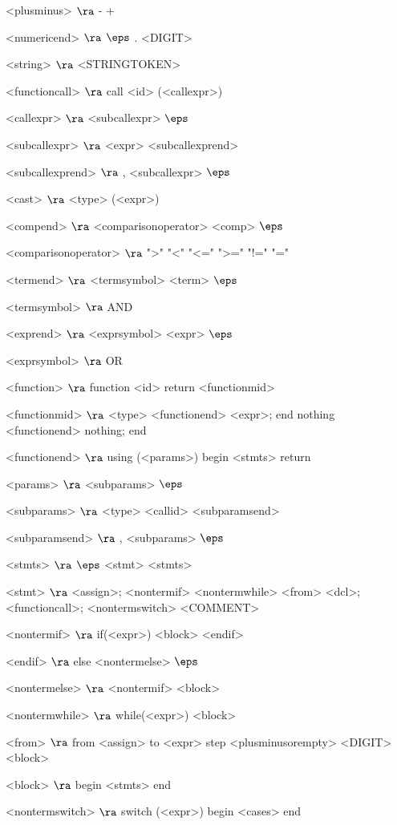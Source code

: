 \begin{grammar}
<plusminus> $\ra$ - 
\alt +

<numericend> $\ra$ $\eps$
\alt . <DIGIT>

<string> $\ra$ <STRINGTOKEN>

<functioncall> $\ra$ call <id> (<callexpr>)

<callexpr> $\ra$ <subcallexpr>
\alt$\eps$

<subcallexpr> $\ra$ <expr> <subcallexprend>

<subcallexprend> $\ra$ , <subcallexpr>
\alt$\eps$

<cast> $\ra$ <type> (<expr>)

<compend> $\ra$ <comparisonoperator> <comp>
\alt$\eps$

<comparisonoperator> $\ra$ ">"
				\alt "<"
				\alt "<="
				\alt ">="
				\alt "!="
				\alt "="

<termend> $\ra$ <termsymbol> <term>
\alt$\eps$

<termsymbol> $\ra$ AND 

<exprend> $\ra$ <exprsymbol> <expr>
\alt$\eps$

<exprsymbol> $\ra$ OR 

<function> $\ra$ function <id> return <functionmid>

<functionmid> $\ra$ <type> <functionend> <expr>; end
\alt nothing <functionend> nothing; end

<functionend> $\ra$
using (<params>)
begin
	<stmts>
	return

<params> $\ra$ <subparams>
	\alt$\eps$

<subparams> $\ra$ <type> <callid> <subparamsend>

<subparamsend> $\ra$ , <subparams>
\alt$\eps$

<stmts> $\ra$ $\eps$
	\alt <stmt> <stmts>

<stmt> $\ra$ <assign>;
	\alt <nontermif>
	\alt <nontermwhile>
	\alt <from>
	\alt <dcl>;
	\alt <functioncall>;
	\alt <nontermswitch>
	\alt <COMMENT>
	
<nontermif> $\ra$ if(<expr>)
	<block>
	<endif>

<endif> $\ra$ 
	else <nontermelse>
	\alt$\eps$

<nontermelse> $\ra$ <nontermif>
	\alt <block>

<nontermwhile> $\ra$ while(<expr>)
		<block>
		
<from> $\ra$ from <assign> to <expr> step <plusminusorempty> <DIGIT>
	<block>

<block> $\ra$ 
	begin
		<stmts>
	end

<nontermswitch> $\ra$ switch (<expr>)
		begin
			<cases>
		end


\end{grammar}
